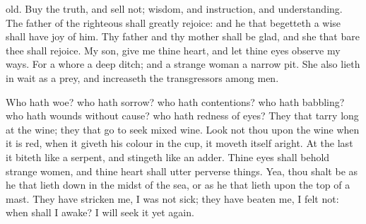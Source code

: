 {old.
Buy the
truth, and
sell
{} not;
{}
wisdom, and
instruction, and
understanding.
The
father of the
righteous shall
greatly
rejoice: and he that
begetteth a
wise
{} shall have
joy of him.
Thy
father and thy
mother shall be
glad, and she that
bare thee shall
rejoice.
My
son,
give me thine
heart, and let thine
eyes
observe my
ways.
For a
whore
{} a
deep
ditch; and a strange
woman
{} a
narrow
pit.
She also lieth in
wait as
{} a
prey, and
increaseth the
transgressors among
men.
\par }{\PP {}Who hath
woe? who hath
sorrow? who hath
contentions? who hath
babbling? who hath
wounds without
cause? who hath
redness of
eyes?
They that tarry
long at the
wine; they that
go to
seek mixed
wine.
Look not thou upon the
wine when it is
red, when it
giveth his
colour in the
cup,
{} it
moveth itself
aright.
At the
last it
biteth like a
serpent, and
stingeth like an
adder.
Thine
eyes shall
behold strange
women, and thine
heart shall
utter perverse
things.
Yea, thou shalt be as he that lieth
down in the
midst of the
sea, or as he that
lieth upon the
top of a
mast.
They have
stricken me,
{} I was not
sick; they have
beaten me,
{} I
felt
{} not: when shall I
awake? I will
seek it
yet again.

}

